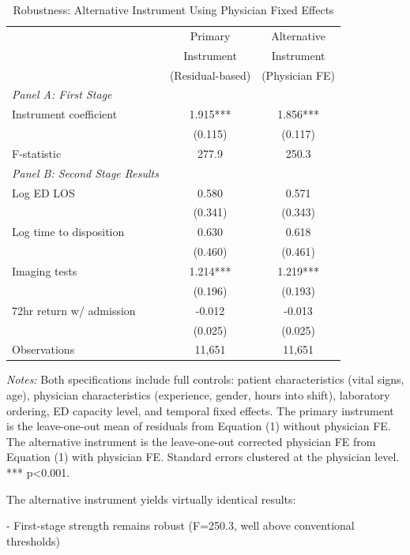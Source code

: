 \documentclass[11pt]{article}
\newcommand{\1}{\hbox{\rm 1\kern-.35em 1}}
\begin{document}
\begin{table}[H]
\centering
\caption*{Robustness: Alternative Instrument Using Physician Fixed Effects}
\begin{threeparttable}
\begin{tabular}{lcc}
\toprule
& Primary & Alternative \\
& Instrument & Instrument \\
& (Residual-based) & (Physician FE) \\
\midrule
\textit{Panel A: First Stage} \\
Instrument coefficient & 1.915*** & 1.856*** \\
& (0.115) & (0.117) \\
F-statistic & 277.9 & 250.3 \\
\midrule
\textit{Panel B: Second Stage Results} \\
Log ED LOS & 0.580 & 0.571 \\
& (0.341) & (0.343) \\
Log time to disposition & 0.630 & 0.618 \\
& (0.460) & (0.461) \\
Imaging tests & 1.214*** & 1.219*** \\
& (0.196) & (0.193) \\
72hr return w/ admission & -0.012 & -0.013 \\
& (0.025) & (0.025) \\
\midrule
Observations & 11,651 & 11,651 \\
\bottomrule
\end{tabular}
\begin{tablenotes}
\footnotesize
\item \textit{Notes:} Both specifications include full controls: patient characteristics (vital signs, age), physician characteristics (experience, gender, hours into shift), laboratory ordering, ED capacity level, and temporal fixed effects. The primary instrument is the leave-one-out mean of residuals from Equation (1) without physician FE. The alternative instrument is the leave-one-out corrected physician FE from Equation (1) with physician FE. Standard errors clustered at the physician level. *** p<0.001.
\end{tablenotes}
\end{threeparttable}
\end{table}

The alternative instrument yields virtually identical results:

- First-stage strength remains robust (F=250.3, well above conventional thresholds)
\end{document}
